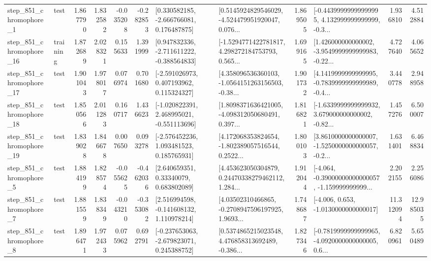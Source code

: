 \begin{tabular}{llrrrrllrlrr}
   step\_851\_chromophore\_1 &      test &      1.867790 &    1.832582 &     -0.035208 & -0.282853 &    [0.330582185, -2.666766081, 0.176487875] &  [0.5145924829546029, -4.524479951920047, 0.076... &       1.869505 &  [-0.44399999999999995, 4.132999999999999, -0.3... &            1.936810 &          4.512884 \\
  step\_851\_chromophore\_16 &  training &      1.872689 &    2.028321 &      0.155633 &  1.391999 &   [0.947832336, -2.711611222, -0.388564833] &  [-1.5294771422781817, 4.298272184753793, 0.565... &       1.699165 &  [1.426000000000002, -3.9549999999999983, -0.22... &            4.727640 &          4.065652 \\
  step\_851\_chromophore\_17 &      test &      1.901043 &    1.978017 &      0.076974 &  0.701680 &    [-2.591026973, 0.407193962, 0.115324327] &  [4.358096536360103, -1.0564151263156503, -0.38... &       1.901732 &  [4.1419999999999995, -0.7839999999999989, -0.4... &            3.440778 &          2.948958 \\
  step\_851\_chromophore\_18 &      test &      1.850566 &    2.011283 &      0.160717 &  1.436623 &   [-1.020822391, 2.468995021, -0.551113696] &  [1.8098371636421005, -4.098312050680491, 0.397... &       1.816821 &  [-1.6339999999999932, 3.679000000000002, -0.82... &            1.457276 &          6.500007 \\
  step\_851\_chromophore\_19 &      test &      1.839028 &    1.846678 &      0.007650 &  0.093278 &    [-2.576452236, 1.093481523, 0.185765931] &  [4.172068353824654, -1.802389057516544, 0.2522... &       1.800103 &  [3.8610000000000007, -1.5250000000000057, -0.2... &            1.631401 &          6.468834 \\
   step\_851\_chromophore\_5 &      test &      1.884199 &    1.828574 &     -0.055625 & -0.462036 &      [2.640659351, 0.33340079, 0.683802089] &  [4.453623050304879, 0.24470338279462112, 1.284... &       1.912044 &  [-4.064, -0.39000000000000057, -1.159999999999... &            2.202155 &          2.256086 \\
   step\_851\_chromophore\_7 &      test &      1.881559 &    1.838349 &     -0.043210 & -0.353082 &    [2.516994598, -0.141608132, 1.110978214] &  [4.03502310466865, -0.2708947596197925, 1.9693... &       1.748687 &               [-4.006, 0.653, -1.0130000000000017] &           11.312094 &         12.985035 \\
   step\_851\_chromophore\_8 &      test &      1.896471 &    1.972433 &      0.075962 &  0.692791 &   [-0.237653063, -2.679823071, 0.245388752] &  [0.5374865215023548, 4.476858313692489, -0.386... &       1.827346 &  [-0.7819999999999965, -4.0920000000000005, 0.6... &            6.820961 &          5.650489 \\

\end{tabular}
